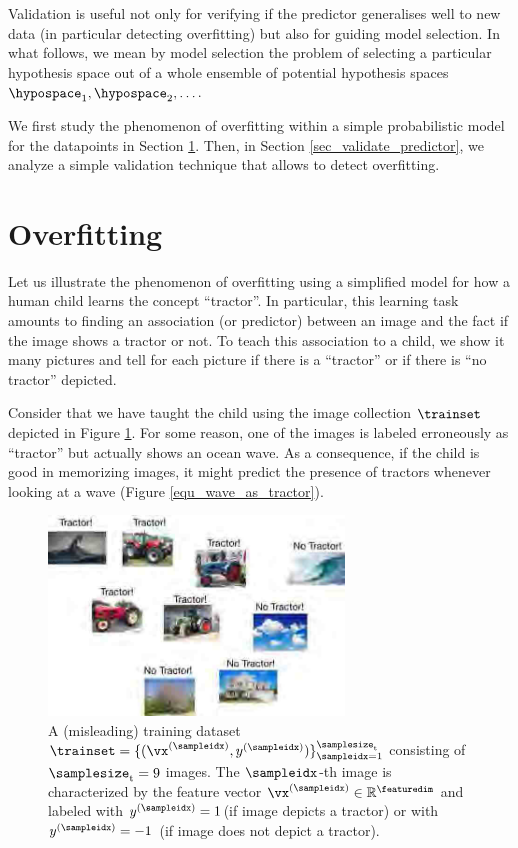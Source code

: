 \documentclass[12pt]{report}
\begin{document}
Validation is useful not only for verifying if the predictor generalises well to 
new data (in particular detecting overfitting) but also for guiding model selection. 
In what follows, we mean by model selection the problem of selecting a 
particular hypothesis space out of a whole ensemble of potential hypothesis spaces $\hypospace_{1},\hypospace_{2},\ldots$.

We first study the phenomenon of overfitting within a simple probabilistic model for 
the datapoints in Section \ref{sec_overfitting_sec_6}. Then, in Section \ref{sec_validate_predictor}, 
we analyze a simple validation technique that allows to detect overfitting. 


\section{Overfitting}
\label{sec_overfitting_sec_6}

Let us illustrate the phenomenon of overfitting using a simplified model 
for how a human child learns the concept ``tractor''. In particular, this 
learning task amounts to finding an association (or predictor) between 
an image and the fact if the image shows a tractor or not. To teach this 
association to a child, we show it many pictures and tell for each picture 
if there is a ``tractor'' or if there is ``no tractor'' depicted. 

Consider that we have taught the child using the image collection $\trainset$ 
depicted in Figure \ref{fig_misleading_data_set}. For some reason, one of 
the images is labeled erroneously as ``tractor'' but actually shows an ocean 
wave. As a consequence, if the child is good in memorizing images, it might 
predict the presence of tractors whenever looking at a wave (Figure \ref{equ_wave_as_tractor}). 

\begin{figure}[htbp]
	\centering
	\includegraphics[width=0.7\textwidth]{LabeledDataTractorOverfitting1.jpg}  
	\caption{A (misleading) training dataset $\trainset= \{ (\vx^{(\sampleidx)},y^{(\sampleidx)}) \}_{\sampleidx=1}^{\samplesize_{\rm t}}$ 
		consisting of $\samplesize_{\rm t}=9$ images. The $\sampleidx$-th image is characterized by the feature vector $\vx^{(\sampleidx)} \in \mathbb{R}^{\featuredim}$ 
		and labeled with $y^{(\sampleidx)}=1$(if image depicts a tractor) or with $y^{(\sampleidx)}=-1$ (if image does not depict a tractor).}
	\label{fig_misleading_data_set}
\end{figure}
\end{document}
